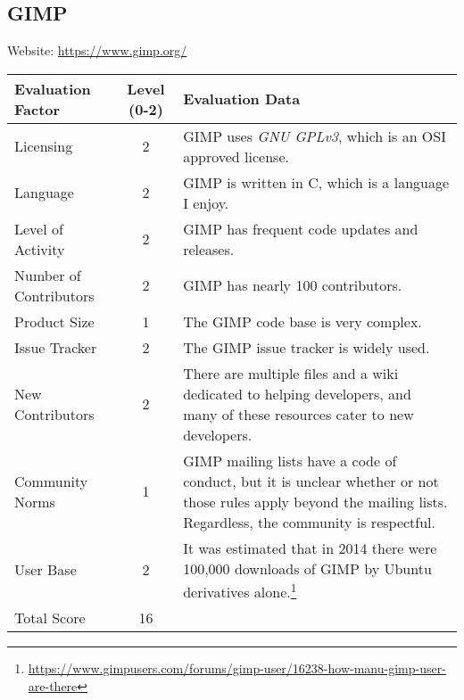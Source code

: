 \documentclass[11pt]{article}
\begin{document}
\subsection{GIMP}
\nopagebreak
Website: \url{https://www.gimp.org/}
\nopagebreak
\begin{center}
\begin{tabularx}{\textwidth}{|l|c|X|}
	\hline
	\textbf{Evaluation Factor} & \textbf{Level (0-2)} & \textbf{Evaluation Data} \\\hline
	Licensing & 2 & GIMP uses \textit{GNU GPLv3}, which is an OSI approved license.\\\hline
	Language & 2 & GIMP is written in C, which is a language I enjoy.\\\hline
	Level of Activity & 2 & GIMP has frequent code updates and releases.\\\hline
	Number of Contributors & 2 & GIMP has nearly 100 contributors.\\\hline
	Product Size & 1 & The GIMP code base is very complex.\\\hline
	Issue Tracker & 2 & The GIMP issue tracker is widely used.\\\hline
	New Contributors & 2 & There are multiple files and a wiki dedicated to helping developers, and many of these resources cater to new developers.\\\hline
	Community Norms & 1 & GIMP mailing lists have a code of conduct, but it is unclear whether or not those rules apply beyond the mailing lists.  Regardless, the community is respectful.\\\hline
	User Base & 2 & It was estimated that in 2014 there were 100,000 downloads of GIMP by Ubuntu derivatives alone.\footnote{\url{https://www.gimpusers.com/forums/gimp-user/16238-how-manu-gimp-user-are-there}}\\\hline
	Total Score & 16 & \\\hline
\end{tabularx}
\end{center}
\end{document}
